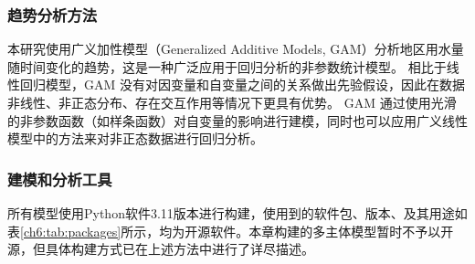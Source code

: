 
\subsubsection*{趋势分析方法}

本研究使用广义加性模型（Generalized Additive Models, GAM）分析地区用水量随时间变化的趋势，这是一种广泛应用于回归分析的非参数统计模型。
相比于线性回归模型，GAM 没有对因变量和自变量之间的关系做出先验假设，因此在数据非线性、非正态分布、存在交互作用等情况下更具有优势。
GAM 通过使用光滑的非参数函数（如样条函数）对自变量的影响进行建模，同时也可以应用广义线性模型中的方法来对非正态数据进行回归分析。


\subsubsection*{建模和分析工具}

所有模型使用Python软件3.11版本进行构建，使用到的软件包、版本、及其用途如表\ref{ch6:tab:packages}所示，均为开源软件。本章构建的多主体模型暂时不予以开源，但具体构建方式已在上述方法中进行了详尽描述。

